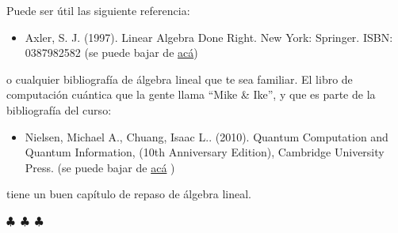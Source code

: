 \documentclass[a4paper,12pt]{article}
\begin{document}
Puede ser útil las siguiente referencia:
 \begin{itemize}
     \item Axler, S. J. (1997). Linear Algebra Done Right. New York: Springer. ISBN: 0387982582 (se puede bajar de \href{https://drive.google.com/file/d/1_qZOW2kRbgqRhuUlvlGcM7RA3KjVcvuB/view?usp=sharing}{acá})
 \end{itemize}
o cualquier bibliografía de álgebra lineal que te sea familiar. El libro de computación cuántica que la gente llama ``Mike \& Ike'', y que es parte de la bibliografía del curso:
\begin{itemize}
    \item Nielsen, Michael A., Chuang, Isaac L.. (2010). Quantum Computation and Quantum Information, (10th Anniversary Edition), Cambridge University Press. (se puede bajar de \href{https://drive.google.com/file/d/1qk7L6Roq1WlGWSahW66ZX-rwl_wjTxcL/view?usp=sharing}{acá} )
\end{itemize}
tiene un buen capítulo de repaso de álgebra lineal.
\begin{center}
    $\clubsuit$~$\clubsuit$~$\clubsuit$
  \end{center}
\end{document}
